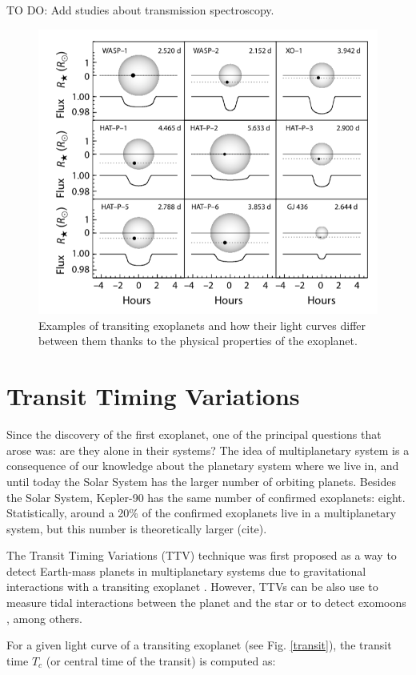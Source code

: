 TO DO: Add studies about transmission spectroscopy.            

\begin{figure}[H]
\centering
\includegraphics[width=0.8\columnwidth]{imagenes/transit_examples.png}
\caption{Examples of transiting exoplanets and how their light curves differ between them thanks to the physical properties of the exoplanet.}
\label{transit_examples}
\end{figure}


\section{Transit Timing Variations}

Since the discovery of the first exoplanet, one of the principal questions that arose was: are they alone in their systems? The idea of multiplanetary system is a consequence of our knowledge about the planetary system where we live in, and until today the Solar System has the larger number of orbiting planets. Besides the Solar System, Kepler-90 has the same number of confirmed exoplanets: eight. Statistically, around a 20\% of the confirmed exoplanets live in a multiplanetary system, but this number is theoretically larger (cite). 

The Transit Timing Variations (TTV) technique was first proposed as a way to detect Earth-mass planets in multiplanetary systems due to gravitational interactions with a transiting exoplanet \citep{Holman2005,Agol2005}. However, TTVs can be also use to measure tidal interactions between the planet and the star or to detect exomoons \citep{Kipping2009a,Kipping2009b}, among others. 

For a given light curve of a transiting exoplanet (see Fig. \ref{transit}), the transit time $T_{c}$ (or central time of the transit) is computed as:

